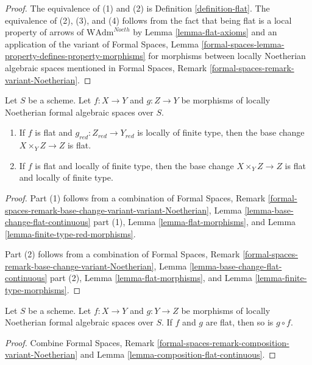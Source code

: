 \begin{proof}
The equivalence of (1) and (2) is Definition \ref{definition-flat}.
The equivalence of (2), (3), and (4) follows from the fact that
being flat is a local property of arrows of
$\text{WAdm}^{Noeth}$ by Lemma \ref{lemma-flat-axioms}
and an application of the variant of
Formal Spaces, Lemma
\ref{formal-spaces-lemma-property-defines-property-morphisms}
for morphisms between locally Noetherian algebraic spaces
mentioned in
Formal Spaces, Remark
\ref{formal-spaces-remark-variant-Noetherian}.
\end{proof}

\begin{lemma}
\label{lemma-base-change-flat}
Let $S$ be a scheme. Let $f : X \to Y$ and $g : Z \to Y$
be morphisms of locally Noetherian formal algebraic spaces over $S$.
\begin{enumerate}
\item If $f$ is flat and $g_{red} : Z_{red} \to Y_{red}$ is
locally of finite type, then the base change
$X \times_Y Z \to Z$ is flat.
\item If $f$ is flat and locally of finite type, then
the base change $X \times_Y Z \to Z$ is flat and locally of finite type.
\end{enumerate}
\end{lemma}

\begin{proof}
Part (1) follows from a combination of
Formal Spaces, Remark
\ref{formal-spaces-remark-base-change-variant-variant-Noetherian},
Lemma \ref{lemma-base-change-flat-continuous} part (1),
Lemma \ref{lemma-flat-morphisms}, and
Lemma \ref{lemma-finite-type-red-morphisms}.

\medskip\noindent
Part (2) follows from a combination of
Formal Spaces, Remark
\ref{formal-spaces-remark-base-change-variant-Noetherian},
Lemma \ref{lemma-base-change-flat-continuous} part (2),
Lemma \ref{lemma-flat-morphisms}, and
Lemma \ref{lemma-finite-type-morphisms}.
\end{proof}

\begin{lemma}
\label{lemma-composition-flat}
Let $S$ be a scheme. Let $f : X \to Y$ and $g : Y \to Z$
be morphisms of locally Noetherian formal algebraic spaces over $S$.
If $f$ and $g$ are flat, then so is $g \circ f$.
\end{lemma}

\begin{proof}
Combine Formal Spaces, Remark
\ref{formal-spaces-remark-composition-variant-Noetherian}
and Lemma \ref{lemma-composition-flat-continuous}.
\end{proof}

